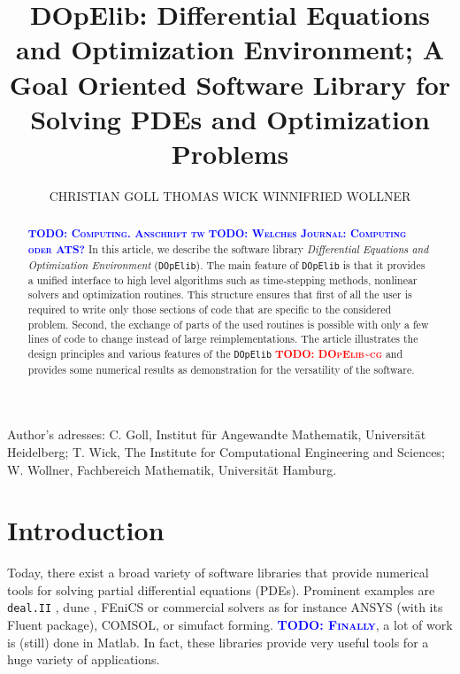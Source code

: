 \documentclass[prodmode,acmtoms]{acmsmall}
\numberwithin{equation}{section}
\newcommand{\deal}{\texttt{deal.II}}
\newcommand{\dope}{\texttt{DOpElib}}
\newcommand{\todo}[1]{\textbf{\textsc{\textcolor{blue}{TODO: #1}}}}
\newcommand{\todocg}[1]{\textbf{\textsc{\textcolor{red}{TODO: #1\textasciitilde cg}}}}
\begin{document}

\title{DOpElib: Differential Equations and Optimization Environment; A Goal Oriented Software Library for Solving PDEs and Optimization Problems}

\author{CHRISTIAN GOLL
THOMAS WICK
WINNIFRIED WOLLNER
}


\begin{abstract}
\todo{Computing. Anschrift tw}
\todo{Welches Journal: Computing oder ATS?}
In this article, we describe the software library 
\textit{Differential Equations and Optimization Environment} (\dope{}).
The main feature of \dope{} is that it provides a unified interface to high level algorithms 
such as time-stepping methods, nonlinear solvers and optimization routines. This structure ensures 
that first of all the user is required to write only those sections of code that are specific to 
the considered problem. Second, the exchange of parts of the used routines is possible 
with only a few lines of code to change instead of large reimplementations.
The article illustrates the design principles and various features
of the \dope{} \todocg{DOpElib} and provides some 
numerical results as demonstration for the versatility of the software.
\end{abstract}

\begin{bottomstuff}
Author's adresses: C. Goll, Institut f\"ur Angewandte Mathematik,
Universit\"at Heidelberg;
T. Wick, The Institute for Computational Engineering and Sciences;
W. Wollner, Fachbereich Mathematik, Universit\"at Hamburg.
\end{bottomstuff}
                      

\maketitle


\section{Introduction}
\label{introduction}
Today, there exist a broad variety of software libraries
that provide numerical tools for solving partial differential
equations (PDEs). Prominent examples are 
\deal{} \cite{dealnew}, dune \cite{dune}, 
FEniCS \cite{fenics}
or commercial solvers as for instance ANSYS (with its Fluent package),
COMSOL, or simufact forming.
\todo{Finally}, a lot of work is (still) done in Matlab.
In fact, these libraries provide very useful tools 
for a huge variety of applications. 
\end{document}

